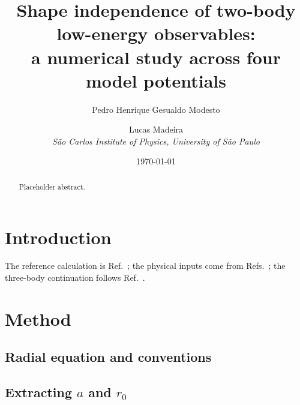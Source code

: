 \documentclass[11pt,a4paper]{article}
\newcommand{\affiliation}[1]{\\ \small\textit{#1}}
\begin{document}
\title{Shape independence of two-body low-energy observables:\\
       a numerical study across four model potentials}

\author{Pedro Henrique Gesualdo Modesto \and Lucas Madeira
        \affiliation{S\~ao Carlos Institute of Physics, University of S\~ao Paulo}}
\date{\today}

\maketitle

\begin{abstract}
Placeholder abstract.
\end{abstract}

\section{Introduction}
The reference calculation is Ref.~\cite{macedolima2023}; the physical inputs
come from Refs.~\cite{hackenburg2006,cencek2012}; the three-body continuation
follows Ref.~\cite{madeira2021}.

\section{Method}
\subsection{Radial equation and conventions}

\subsection{Extracting $a$ and $r_0$}
\end{document}
